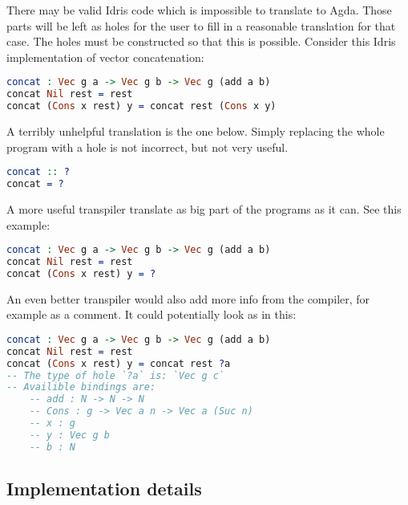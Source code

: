 \documentclass[parskip=half]{scrartcl}
\begin{document}

There may be valid Idris code which is impossible to translate to Agda.  Those
parts will be left as holes for the user to fill in a reasonable translation
for that case.
The holes must be constructed so that this is possible. Consider this
Idris implementation of vector concatenation: %

\begin{lstlisting}[language=Idris,label={lst:hole1},caption={}]
concat : Vec g a -> Vec g b -> Vec g (add a b)
concat Nil rest = rest
concat (Cons x rest) y = concat rest (Cons x y)
\end{lstlisting}

A terribly unhelpful translation is the one below. %
Simply replacing the whole program with a hole is not incorrect, but not very
useful.

\begin{lstlisting}[language=Idris,label={lst:hole2},caption={}]
concat :: ?
concat = ?
\end{lstlisting}

A more useful transpiler translate as big part of the programs as it can. See
this example: %

\begin{lstlisting}[language=Idris,label={lst:hole3},caption={}]
concat : Vec g a -> Vec g b -> Vec g (add a b)
concat Nil rest = rest
concat (Cons x rest) y = ?
\end{lstlisting}

An even better transpiler would also add more info from the compiler, for
example as a comment. It could potentially look as in this:

\begin{lstlisting}[language=Idris,label={lst:hole4},caption={}]
concat : Vec g a -> Vec g b -> Vec g (add a b)
concat Nil rest = rest
concat (Cons x rest) y = concat rest ?a
-- The type of hole `?a` is: `Vec g c`
-- Availible bindings are:
    -- add : N -> N -> N
    -- Cons : g -> Vec a n -> Vec a (Suc n)
    -- x : g
    -- y : Vec g b
    -- b : N
\end{lstlisting}


\subsection{Implementation details}
\end{document}
